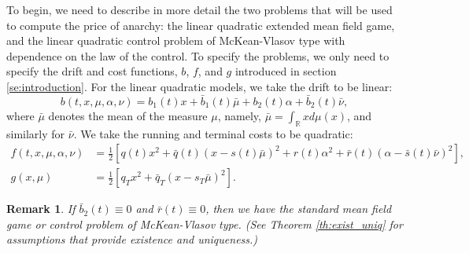 \documentclass[11pt]{article}
\newtheorem{remark}{Remark}
\begin{document}
To begin, we need to describe in more detail the two problems that will be used to compute the price of anarchy: the linear quadratic extended mean field game, and the linear quadratic control problem of McKean-Vlasov type with dependence on the law of the control. To specify the problems, we only need to specify the drift and cost functions, $b$, $f$, and $g$ introduced in section \ref{se:introduction}. For the linear quadratic models, we take the drift to be linear:
\begin{equation*}
    b(t,x,\mu,\alpha,\nu)=b_1(t)x+\bar{b}_1(t) \bar{\mu}+b_2(t) \alpha+\bar{b}_2(t) \bar{\nu},
\end{equation*}
where $\bar{\mu}$ denotes the mean of the measure $\mu$, namely, $\bar{\mu}=\int_{\mathbb{R}}xd\mu(x)$, and similarly for $\bar{\nu}$. We take the running and terminal costs to be quadratic:
\begin{equation*}
\begin{split}
    f(t,x,\mu,\alpha,\nu)&=\frac{1}{2}\left[q(t)x^2+\bar{q}(t)(x-s(t)\bar{\mu})^2 +r(t)\alpha^2+\bar{r}(t)(\alpha-\bar{s}(t)\bar{\nu})^2\right], \\
    g(x,\mu)&=\frac{1}{2}\left[q_T x^2+\bar{q}_T (x-s_T \bar{\mu})^2\right].
\end{split}
\end{equation*}
\begin{remark}
If $\bar{b}_2(t)\equiv0$ and $\bar{r}(t)\equiv0$, then we have the standard mean field game or control problem of McKean-Vlasov type. (See Theorem \ref{th:exist_uniq} for assumptions that provide existence and uniqueness.)
\label{remark_2}
\end{remark}
\end{document}

